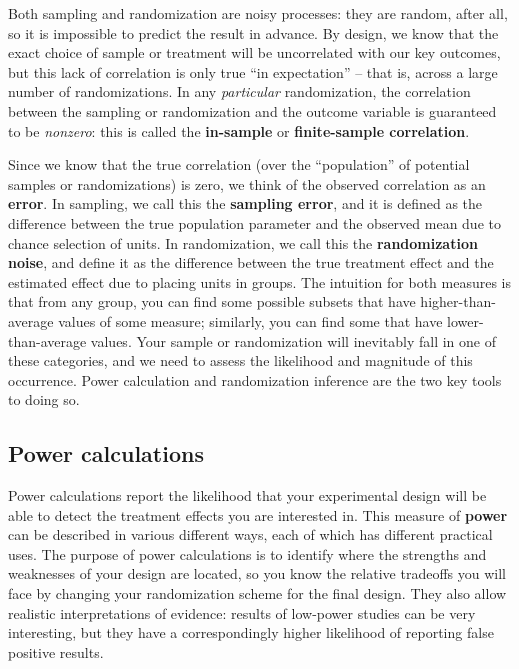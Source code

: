 Both sampling and randomization are noisy processes:
they are random, after all, so it is impossible to predict the result in advance.
By design, we know that the exact choice of sample or treatment
will be uncorrelated with our key outcomes,
but this lack of correlation is only true ``in expectation'' --
that is, across a large number of randomizations.
In any \textit{particular} randomization,
the correlation between the sampling or randomization and the outcome variable
is guaranteed to be \textit{nonzero}:
this is called the \textbf{in-sample} or \textbf{finite-sample correlation}.

Since we know that the true correlation
(over the ``population'' of potential samples or randomizations)
is zero, we think of the observed correlation as an \textbf{error}.
In sampling, we call this the \textbf{sampling error},
and it is defined as the difference between the true population parameter
and the observed mean due to chance selection of units.
In randomization, we call this the \textbf{randomization noise},
and define it as the difference between the true treatment effect
and the estimated effect due to placing units in groups.
The intuition for both measures is that from any group,
you can find some possible subsets that have higher-than-average values of some measure;
similarly, you can find some that have lower-than-average values.
Your sample or randomization will inevitably fall in one of these categories,
and we need to assess the likelihood and magnitude of this occurrence.
Power calculation and randomization inference are the two key tools to doing so.

\subsection{Power calculations}

Power calculations report the likelihood that your experimental design
will be able to detect the treatment effects you are interested in.
This measure of \textbf{power} can be described in various different ways,
each of which has different practical uses.
The purpose of power calculations is to identify where the strengths and weaknesses
of your design are located, so you know the relative tradeoffs you will face
by changing your randomization scheme for the final design.
They also allow realistic interpretations of evidence:
results of low-power studies can be very interesting,
but they have a correspondingly higher likelihood
of reporting false positive results.

